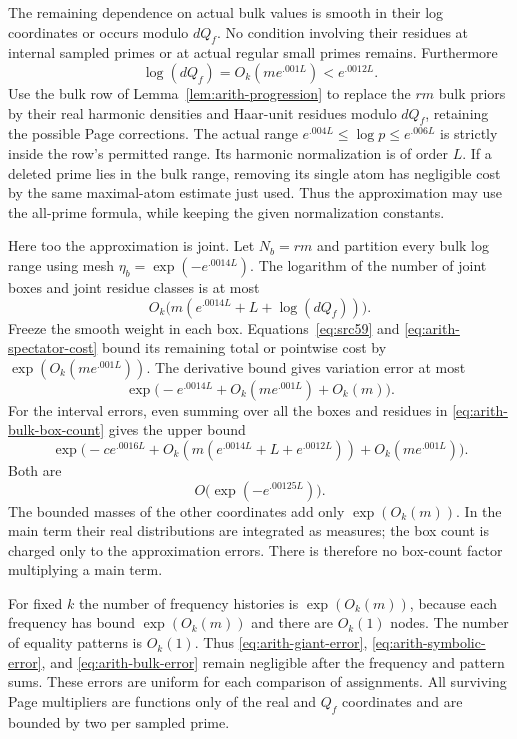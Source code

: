 The remaining dependence on actual bulk values is smooth in their log
coordinates or occurs modulo $dQ_f$. No condition involving their residues
at internal sampled primes or at actual regular small primes remains.
Furthermore
\begin{equation}\label{eq:arith-bulk-modulus}
              \log(dQ_f)=O_k(m e^{.001L})<e^{.0012L}.
\end{equation}
Use the bulk row of Lemma~\ref{lem:arith-progression} to replace the $rm$
bulk priors by their real harmonic densities and Haar-unit residues modulo
$dQ_f$, retaining the possible Page corrections. The actual range
$e^{.004L}\leq\log p\leq e^{.006L}$ is strictly inside the row's permitted
range. Its harmonic normalization is of order $L$. If a deleted prime lies
in the bulk range, removing its single atom has negligible cost by the same
maximal-atom estimate just used. Thus the approximation may use the all-prime
formula, while keeping the given normalization constants.

Here too the approximation is joint. Let $N_b=rm$ and partition every bulk
log range using mesh $\eta_b=\exp(-e^{.0014L})$. The logarithm of the number
of joint boxes and joint residue classes is at most
\begin{equation}\label{eq:arith-bulk-box-count}
 O_k\bigl(m(e^{.0014L}+L+\log(dQ_f))\bigr).
\end{equation}
Freeze the smooth weight in each box. Equations~\eqref{eq:src59} and
\eqref{eq:arith-spectator-cost} bound its remaining total or pointwise
cost by $\exp(O_k(m e^{.001L}))$. The derivative bound gives variation
error at most
\[
 \exp\bigl(-e^{.0014L}+O_k(m e^{.001L})+O_k(m)\bigr).
\]
For the interval errors, even summing over all the boxes and residues in
\eqref{eq:arith-bulk-box-count} gives the upper bound
\[
 \exp\bigl(-c e^{.0016L}
       +O_k(m(e^{.0014L}+L+e^{.0012L}))
       +O_k(m e^{.001L})\bigr).
\]
Both are
\begin{equation}\label{eq:arith-bulk-error}
                              O\bigl(\exp(-e^{.00125L})\bigr).
\end{equation}
The bounded masses of the other coordinates add only $\exp(O_k(m))$.
In the main term their real distributions are integrated as measures; the
box count is charged only to the approximation errors. There is therefore
no box-count factor multiplying a main term.

For fixed $k$ the number of frequency histories is $\exp(O_k(m))$, because
each frequency has bound $\exp(O_k(m))$ and there are $O_k(1)$ nodes. The
number of equality patterns is $O_k(1)$. Thus
\eqref{eq:arith-giant-error}, \eqref{eq:arith-symbolic-error}, and
\eqref{eq:arith-bulk-error} remain negligible after the frequency and pattern
sums. These errors are uniform for each comparison of assignments. All
surviving Page multipliers are functions only of the real and $Q_f$
coordinates and are bounded by two per sampled prime.

